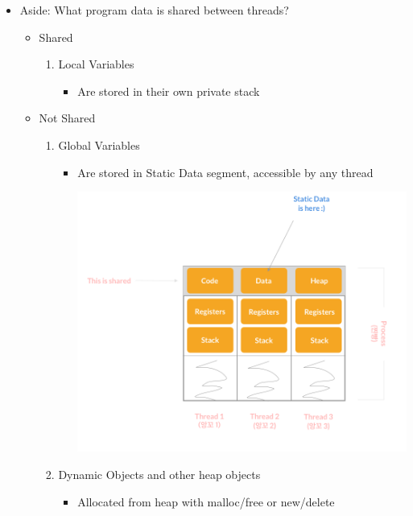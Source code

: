 \documentclass[12pt]{article}
\begin{document}
\begin{itemize}
    \item Aside: What program data is shared between threads?
    \begin{itemize}
        \item Shared
        \begin{enumerate}[1.]
            \item Local Variables
            \begin{itemize}
                \item Are stored in their own private stack
            \end{itemize}
        \end{enumerate}
        \item Not Shared
        \begin{enumerate}[1.]
            \item Global Variables
            \begin{itemize}
                \item Are stored in Static Data segment, accessible by any thread

                \begin{center}
                \includegraphics[width=0.8\linewidth]{images/week_2_notes_2_7.png}
                \end{center}

            \end{itemize}
            \item Dynamic Objects and other heap objects
            \begin{itemize}
                \item Allocated from heap with malloc/free or new/delete


\end{itemize}
\end{enumerate}
\end{itemize}
\end{itemize}
\end{document}
